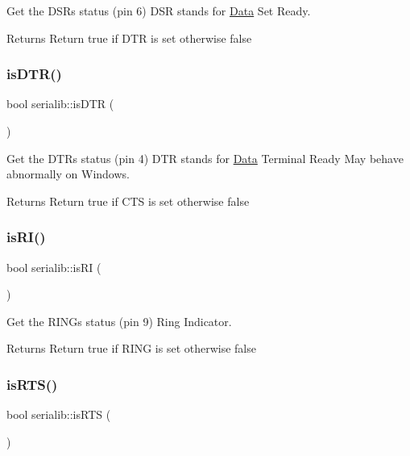 Get the D\+SR\textquotesingle{}s status (pin 6) D\+SR stands for \hyperlink{classData}{Data} Set Ready. 

\begin{DoxyReturn}{Returns}
Return true if D\+TR is set otherwise false 
\end{DoxyReturn}
\mbox{\label{classserialib_a4ec78286be81602bf1df44a4eb8372a8}} 
\subsubsection{\texorpdfstring{is\+D\+T\+R()}{isDTR()}}
{\footnotesize\ttfamily bool serialib\+::is\+D\+TR (\begin{DoxyParamCaption}{ }\end{DoxyParamCaption})}



Get the D\+TR\textquotesingle{}s status (pin 4) D\+TR stands for \hyperlink{classData}{Data} Terminal Ready May behave abnormally on Windows. 

\begin{DoxyReturn}{Returns}
Return true if C\+TS is set otherwise false 
\end{DoxyReturn}
\mbox{\label{classserialib_a605d8a8015fadb5db5521350aefe084e}} 
\subsubsection{\texorpdfstring{is\+R\+I()}{isRI()}}
{\footnotesize\ttfamily bool serialib\+::is\+RI (\begin{DoxyParamCaption}{ }\end{DoxyParamCaption})}



Get the R\+I\+NG\textquotesingle{}s status (pin 9) Ring Indicator. 

\begin{DoxyReturn}{Returns}
Return true if R\+I\+NG is set otherwise false 
\end{DoxyReturn}
\mbox{\label{classserialib_ab2b121af07fb732f82668f6a14e93cfb}} 
\subsubsection{\texorpdfstring{is\+R\+T\+S()}{isRTS()}}
{\footnotesize\ttfamily bool serialib\+::is\+R\+TS (\begin{DoxyParamCaption}{ }\end{DoxyParamCaption})}



